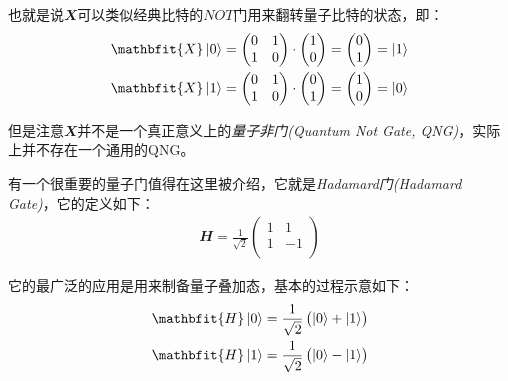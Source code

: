 也就是说$\mathbfit{X}$可以类似经典比特的$NOT$门用来翻转量子比特的状态，即：
\begin{align}
    \mathbfit{X}\ket{0}=\begin{pmatrix}
        0 & 1 \\
        1 & 0 \\
    \end{pmatrix}\cdot \begin{pmatrix}
         1 \\
         0 \\
    \end{pmatrix}=\begin{pmatrix}
        0 \\
        1 \\
   \end{pmatrix}=\ket{1}\\
   \mathbfit{X}\ket{1}=\begin{pmatrix}
    0 & 1 \\
    1 & 0 \\
\end{pmatrix}\cdot \begin{pmatrix}
     0 \\
     1 \\
\end{pmatrix}=\begin{pmatrix}
    1 \\
    0 \\
\end{pmatrix}=\ket{0}\\
\end{align}

但是注意$\mathbfit{X}$并不是一个真正意义上的\emph{量子非门(Quantum Not Gate, QNG)}，实际上并不存在一个通用的QNG。

有一个很重要的量子门值得在这里被介绍，它就是\emph{Hadamard门(Hadamard Gate)}，它的定义如下\cite[]{PRUDÊNCIO_2013}：
\begin{align}
    \mathbfit{H}=\frac{1}{\sqrt{2}}\begin{pmatrix}
        1 & 1 \\
        1 & -1 \\
    \end{pmatrix}
\end{align}

它的最广泛的应用是用来制备量子叠加态，基本的过程示意如下：
\begin{align}
    \mathbfit{H}\ket{0}=\frac{1}{\sqrt{2}}\begin{pmatrix}
        \ket{0}+\ket{1}
    \end{pmatrix}\\
    \mathbfit{H}\ket{1}=\frac{1}{\sqrt{2}}\begin{pmatrix}
        \ket{0}-\ket{1}
    \end{pmatrix}\\
\end{align}

